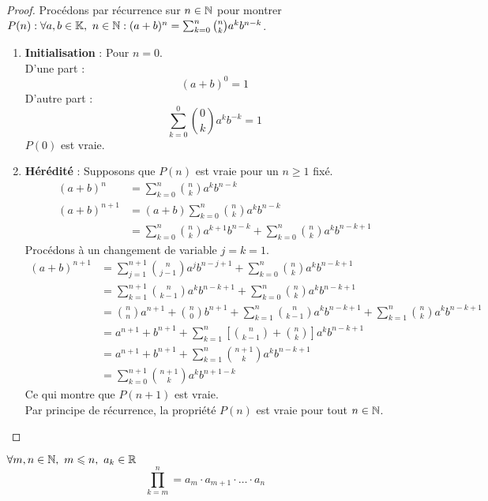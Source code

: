 \begin{proof}
	Procédons par récurrence sur $n \in \mathbb{N}$ pour montrer $P(n) : \forall a, b \in \mathbb{K},\ n \in \mathbb{N} : (a + b)^n = \sum_{k = 0}^{n} \binom{n}{k} a^kb^{n-k}$.
	\begin{enumerate}
		\item \textbf{Initialisation} : Pour $n = 0$.
		\\
		D'une part :
		\[ (a + b)^0 = 1 \]
		D'autre part :
		\[ \sum_{k = 0}^{0} \binom{0}{k} a^k b^{-k} = 1 \]
		$P(0)$ est vraie.
		\item \textbf{Hérédité} : Supposons que $P(n)$ est vraie pour un $n \geq 1$ fixé.
		\\
		\begin{align*}
			(a + b)^n &= \sum_{k=0}^{n} \binom{n}{k} a^k b^{n-k} \\
			(a + b)^{n+1} &= (a+b) \sum_{k=0}^{n} \binom{n}{k} a^k b^{n-k} \\
			&= \sum_{k = 0}^{n} \binom{n}{k} a^{k+1} b^{n-k} + \sum_{k=0}^{n} \binom{n}{k} a^k b^{n - k + 1}
		\end{align*}
		Procédons à un changement de variable $j = k = 1$.
		\begin{align*}
			(a + b)^{n+1} &= \sum_{j = 1}^{n + 1} \binom{n}{j - 1} a^j b^{n - j + 1} + \sum_{k = 0}^{n} \binom{n}{k} a^k b^{n-k+1} \\
			&= \sum_{k = 1}^{n + 1} \binom{n}{k - 1} a^k b^{n - k + 1} + \sum_{k = 0}^{n} \binom{n}{k} a^k b^{n - k + 1} \\
			&= \binom{n}{n} a^{n+1} + \binom{n}{0} b^{n+1} + \sum_{k = 1}^{n} \binom{n}{k - 1} a^k b^{n - k + 1} + \sum_{k = 1}^{n} \binom{n}{k} a^k b^{n - k + 1} \\
			&= a^{n+1} + b^{n+1} + \sum_{k = 1}^{n} \left[ \binom{n}{k - 1} + \binom{n}{k} \right] a^k b^{n - k + 1} \\
			&= a^{n+1} + b^{n+1} + \sum_{k=1}^{n} \binom{n+1}{k} a^k b^{n - k + 1} \\
			&= \sum_{k=0}^{n+1} \binom{n + 1}{k} a^k b^{n + 1 - k}
		\end{align*}
		Ce qui montre que $P(n+1)$ est vraie. 
		\\
		Par principe de récurrence, la propriété $P(n)$ est vraie pour tout $n \in \mathbb{N}$.
	\end{enumerate}
\end{proof}

\begin{definition}[Produit]
    $\forall m, n \in \mathbb{N},\ m \leqslant n,\ a_k \in \mathbb{R}$
    \[ \prod_{k = m}^{n} = a_m \cdot a_{m+1} \cdot \ldots \cdot a_n \]
\end{definition}
